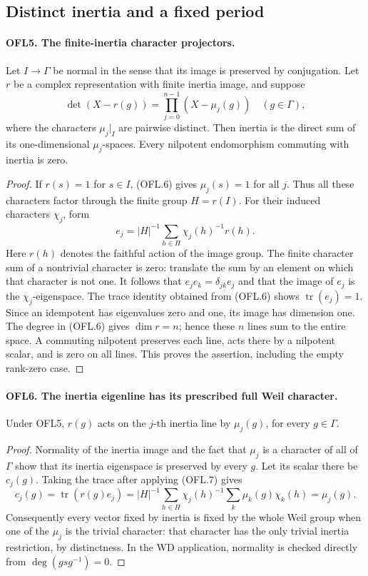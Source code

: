\subsection{Distinct inertia and a fixed period}

\paragraph{OFL5. The finite-inertia character projectors.}
\label{claim:OFL5}
Let \(I\to\Gamma\) be normal in the sense that its image is
preserved by conjugation.  Let \(r\) be a complex representation
with finite inertia image, and suppose
\[
 \det(X-r(g))=\prod_{j=0}^{n-1}(X-\mu_j(g))
                                 \quad(g\in\Gamma),
 \tag{OFL.6}
\]
where the characters \(\mu_j|_I\) are pairwise distinct.
Then inertia is the direct sum of its one-dimensional
\(\mu_j\)-spaces.  Every nilpotent endomorphism commuting with
inertia is zero.
\begin{proof}
If \(r(s)=1\) for \(s\in I\), (OFL.6) gives
\(\mu_j(s)=1\) for all \(j\).  Thus all these characters
factor through the finite group \(H=r(I)\).  For their induced
characters \(\chi_j\), form
\[
        e_j=|H|^{-1}\sum_{h\in H}\chi_j(h)^{-1}r(h).
 \tag{OFL.7}
\]
Here \(r(h)\) denotes the faithful action of the image group.
The finite character sum of a nontrivial character is zero:
translate the sum by an element on which that character is not
one.  It follows that \(e_j e_k=\delta_{jk}e_j\) and that
the image of \(e_j\) is the \(\chi_j\)-eigenspace.
The trace identity obtained from (OFL.6) shows
\(\operatorname{tr}(e_j)=1\).  Since an idempotent has
eigenvalues zero and one, its image has dimension one.
The degree in (OFL.6) gives \(\dim r=n\); hence these \(n\)
lines sum to the entire space.  A commuting nilpotent preserves
each line, acts there by a nilpotent scalar, and is zero on all
lines.  This proves the assertion, including the empty rank-zero
case.
\end{proof}

\paragraph{OFL6. The inertia eigenline has its prescribed full Weil character.}
\label{claim:OFL6}
Under OFL5, \(r(g)\) acts on the \(j\)-th inertia line by
\(\mu_j(g)\), for every \(g\in\Gamma\).
\begin{proof}
Normality of the inertia image and the fact that \(\mu_j\)
is a character of all of \(\Gamma\) show that its inertia
eigenspace is preserved by every \(g\).  Let its scalar there
be \(c_j(g)\).  Taking the trace after applying (OFL.7) gives
\[
 c_j(g)=\operatorname{tr}(r(g)e_j)
  =|H|^{-1}\sum_{h\in H}\chi_j(h)^{-1}
                        \sum_k\mu_k(g)\chi_k(h)
  =\mu_j(g).
\]
Consequently every vector fixed by inertia is fixed by the whole
Weil group when one of the \(\mu_j\) is the trivial character:
that character has the only trivial inertia restriction, by
distinctness.  In the WD application, normality is checked directly
from \(\deg(gsg^{-1})=0\).
\end{proof}


